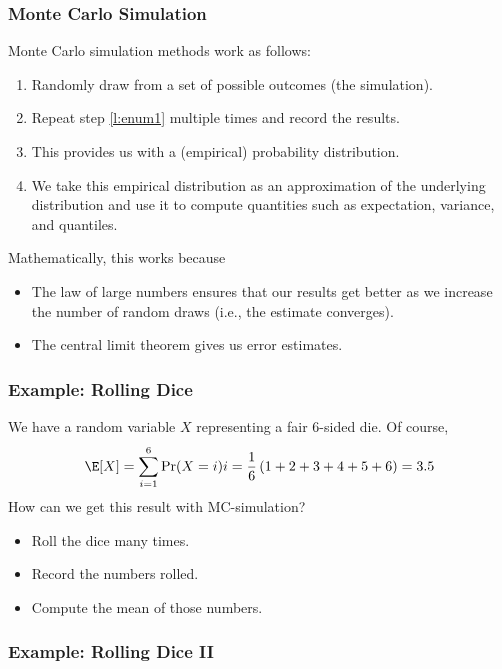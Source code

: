 \begin{frame}[fragile]
\frametitle{Monte Carlo Simulation}
Monte Carlo simulation methods work as follows:
\begin{enumerate}
  \item\label{l:enum1} Randomly draw from a set of possible outcomes (the
  simulation).
  \item Repeat step \ref{l:enum1} multiple times and record the results.
  \item This provides us with a (empirical) probability distribution.
  \item We take this empirical distribution as an approximation of the
  underlying distribution and use it to compute quantities such as
  expectation, variance, and quantiles.
\end{enumerate}
Mathematically, this works because
\begin{itemize}
  \item The law of large numbers ensures that our results get better as we
  	increase the number of random draws (i.e., the estimate converges).
  \item The central limit theorem gives us error estimates.
\end{itemize}
\end{frame}


\begin{frame}[fragile]
\frametitle{Example: Rolling Dice}
We have a random variable $X$ representing a fair 6-sided die. Of course,
\begin{align*}
  \E[X] = \sum_{i=1}^6 \Pr(X=i)i=\frac{1}{6}\left( 1 + 2 + 3 + 4 + 5 + 6
  \right)= 3.5
\end{align*}
How can we get this result with MC-simulation?
\begin{itemize}
  \item Roll the dice many times.
  \item Record the numbers rolled.
  \item Compute the mean of those numbers.
\end{itemize}
\end{frame}

\begin{frame}[fragile]
\frametitle{Example: Rolling Dice II}
\begin{center}
\\

\end{center}
\end{frame}

